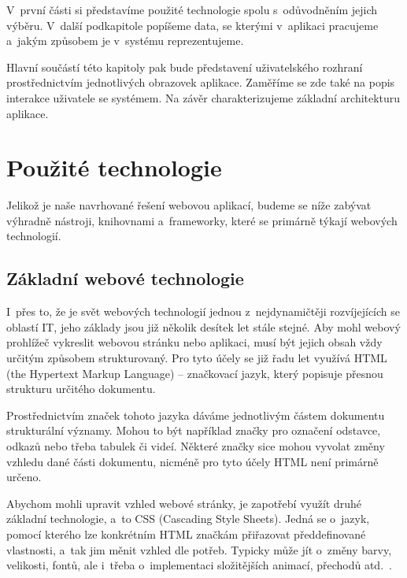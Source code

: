 V~první části si představíme použité technologie spolu s~odůvodněním jejich výběru. V~další podkapitole popíšeme data, se kterými v~aplikaci pracujeme a~jakým způsobem je v~systému reprezentujeme.

Hlavní součástí této kapitoly pak bude představení uživatelského rozhraní prostřednictvím jednotlivých obrazovek aplikace. Zaměříme se zde také na popis interakce uživatele se systémem. Na závěr charakterizujeme základní architekturu aplikace.

\hypertarget{pouux17eituxe9-technologie}{%
\section{Použité technologie}\label{pouux17eituxe9-technologie}}

Jelikož je naše navrhované řešení webovou aplikací, budeme se níže zabývat výhradně nástroji, knihovnami a~frameworky, které se primárně týkají webových technologií.

\hypertarget{zuxe1kladnuxed-webovuxe9-technologie}{%
\subsection{Základní webové technologie}\label{zuxe1kladnuxed-webovuxe9-technologie}}

I~přes to, že je svět webových technologií jednou z~nejdynamičtěji rozvíjejících se oblastí IT, jeho základy jsou již několik desítek let stále stejné. Aby mohl webový prohlížeč vykreslit webovou stránku nebo aplikaci, musí být jejich obsah vždy určitým způsobem strukturovaný. Pro tyto účely se již řadu let využívá HTML (the Hypertext Markup Language) -- značkovací jazyk, který popisuje přesnou strukturu určitého dokumentu.

Prostřednictvím značek tohoto jazyka dáváme jednotlivým částem dokumentu strukturální významy. Mohou to být například značky pro označení odstavce, odkazů nebo třeba tabulek či videí. Některé značky sice mohou vyvolat změny vzhledu dané části dokumentu, nicméně pro tyto účely HTML není primárně určeno\parencite{htmlcss}.

Abychom mohli upravit vzhled webové stránky, je zapotřebí využít druhé základní technologie, a~to CSS (Cascading Style Sheets). Jedná se o~jazyk, pomocí kterého lze konkrétním HTML značkám přiřazovat předdefinované vlastnosti, a~tak jim měnit vzhled dle potřeb. Typicky může jít o~změny barvy, velikosti, fontů, ale i~třeba o~implementaci složitějších animací, přechodů atd.~\parencite{htmlcss}.

